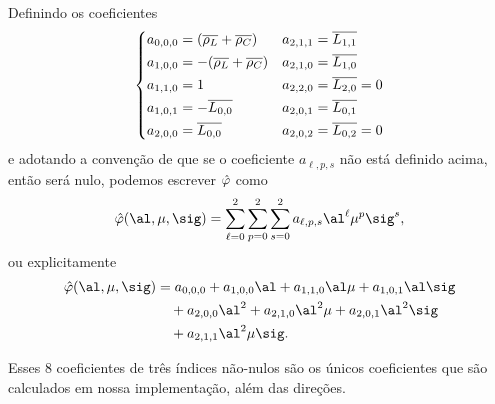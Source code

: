 Definindo os coeficientes \[ \left\{
\begin{aligned}
a_{0,0,0} &= (\overline{\rho_L}+ \overline{\rho_C})     & a_{2,1,1} &=
\overline{L_{1,1}}\\
a_{1,0,0} &= - (\overline{\rho_L} + \overline{\rho_C})   & a_{2,1,0} &=
\overline{L_{1,0}}\\
a_{1,1,0} &= 1 				    & a_{2,2,0} &= \overline{L_{2,0}}=0\\
a_{1,0,1} &= -  \overline{L_{0,0}} & a_{2,0,1} &= \overline{L_{0,1}}\\
a_{2,0,0} &=  \overline{L_{0,0}} & a_{2,0,2} &= \overline{L_{0,2}}=0\\
\end{aligned}\right.	
\]
e adotando a convenção de que se o coeficiente  $a_{\ell,p,s}$ não está definido
acima, então será nulo, podemos escrever $\hat{\varphi}$ como
\[
\nextphi(\al,\mu,\sig) = \sum_{\ell= 0}^2\sum_{p=0}^2 
\sum_{s=0}^2a_{\ell,p,s}\al^\ell\mu^p\sig^s,
\]   
ou explicitamente
\begin{equation}
\begin{aligned}
\nextphi(\al,\mu,\sig) & = 	a_{0,0,0} + a_{1,0,0}\al + a_{1,1,0}\al\mu + 
a_{1,0,1}\al\sig  
\\
&\quad + a_{2,0,0}\al^2
 + a_{2,1,0}\al^2\mu   + a_{2,0,1}\al^2\sig\\ 
& \quad + a_{2,1,1}\al^2\mu\sig.
\end{aligned}
\label{eq:varphi-poly-form}
\end{equation}

Esses 8 
coeficientes de três índices  não-nulos são
os únicos coeficientes que são calculados em nossa implementação, além das
direções.

% 



